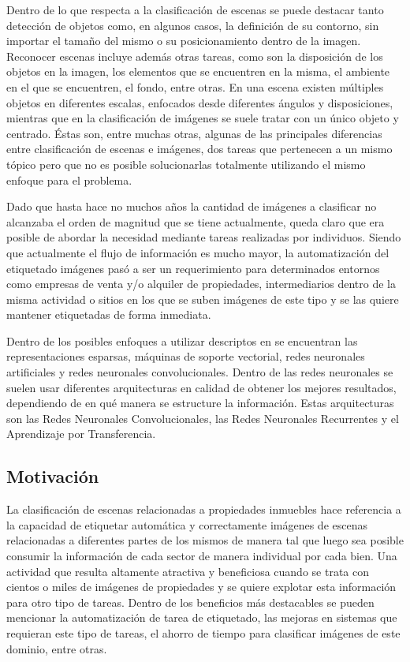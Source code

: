  Dentro de lo que respecta a la clasificación de escenas se puede destacar tanto detección de objetos como, en algunos casos, la definición de su contorno, sin importar el tamaño del mismo o su posicionamiento dentro de la imagen. Reconocer escenas incluye además otras tareas, como son la disposición de los objetos en la imagen, los elementos que se encuentren en la misma, el ambiente en el que se encuentren, el fondo, entre otras. En una escena existen múltiples objetos en diferentes escalas, enfocados desde diferentes ángulos y disposiciones, mientras que en la clasificación de imágenes se suele tratar con un único objeto y centrado. Éstas son, entre muchas otras, algunas de las principales diferencias entre clasificación de escenas e imágenes, dos tareas que pertenecen a un mismo tópico pero que no es posible solucionarlas totalmente utilizando el mismo enfoque para el problema.

Dado que hasta hace no muchos años la cantidad de imágenes a clasificar no alcanzaba el orden de magnitud que se tiene actualmente, queda claro que era posible de abordar la necesidad mediante tareas realizadas por individuos. Siendo que actualmente el flujo de información es mucho mayor, la automatización del etiquetado imágenes pasó a ser un requerimiento para determinados entornos como empresas de venta y/o alquiler de propiedades, intermediarios dentro de la misma actividad o sitios en los que se suben imágenes de este tipo y se las quiere mantener etiquetadas de forma inmediata.

Dentro de los posibles enfoques a utilizar descriptos en \cite{comparation_techniques} se encuentran las representaciones esparsas, máquinas de soporte vectorial, redes neuronales artificiales y redes neuronales convolucionales. Dentro de las redes neuronales se suelen usar diferentes arquitecturas en calidad de obtener los mejores resultados, dependiendo de en qué manera se estructure la información. Estas arquitecturas son las Redes Neuronales Convolucionales, las Redes Neuronales Recurrentes y el Aprendizaje por Transferencia.


\subsection{Motivación}\label{sec:motivacion}

La clasificación de escenas relacionadas a propiedades inmuebles hace referencia a la capacidad de etiquetar automática y correctamente imágenes de escenas relacionadas a diferentes partes de los mismos de manera tal que luego sea posible consumir la información de cada sector de manera individual por cada bien. 
Una actividad que resulta altamente atractiva y beneficiosa cuando se trata con cientos o miles de imágenes de propiedades y se quiere explotar esta información para otro tipo de tareas. Dentro de los beneficios más destacables se pueden mencionar la automatización de tarea de etiquetado, las mejoras en sistemas que requieran este tipo de tareas, el ahorro de tiempo para clasificar imágenes de este dominio, entre otras.

